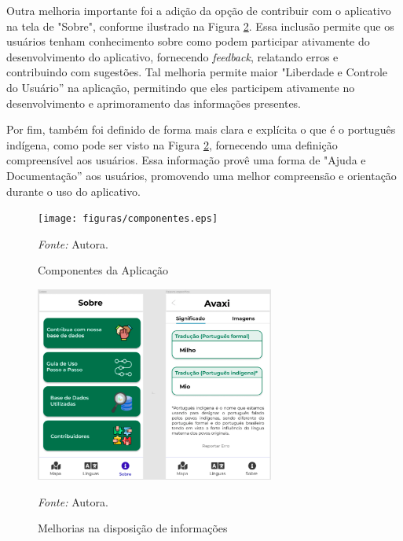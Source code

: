 Outra melhoria importante foi a adição da opção de contribuir com o aplicativo na tela de "Sobre", conforme ilustrado na Figura \ref{fig27}. Essa inclusão permite que os usuários tenham conhecimento sobre como podem participar ativamente do desenvolvimento do aplicativo, 
fornecendo \textit{feedback}, relatando erros e contribuindo com sugestões. Tal melhoria permite maior "Liberdade e Controle do Usuário'' na aplicação, permitindo que eles participem ativamente no desenvolvimento e aprimoramento 
das informações presentes.

Por fim, também foi definido de forma mais clara e explícita o que é o português indígena, como pode ser visto na Figura \ref{fig27}, fornecendo uma definição compreensível aos usuários. Essa informação provê uma forma de "Ajuda e Documentação'' aos usuários, promovendo uma melhor 
compreensão e orientação durante o uso do aplicativo.

\begin{figure}[h!]
	\centering
	\caption{Componentes da Aplicação}
	\begin{adjustbox}{center}
		\texttt{[image: figuras/componentes.eps]}
	\end{adjustbox}
	\begin{tablenotes}[flushleft]
		\centering
		\item \textit{Fonte:} Autora.
	\end{tablenotes}
	\label{fig26}
\end{figure}

\begin{figure}[h!]
	\centering
	\caption{Melhorias na disposição de informações}
	\begin{adjustbox}{center}
		\includegraphics[width=0.7\textwidth]{figuras/melhorias.eps}
	\end{adjustbox}
	\begin{tablenotes}[flushleft]
		\centering
		\item \textit{Fonte:} Autora.
	\end{tablenotes}
	\label{fig27}
\end{figure}


